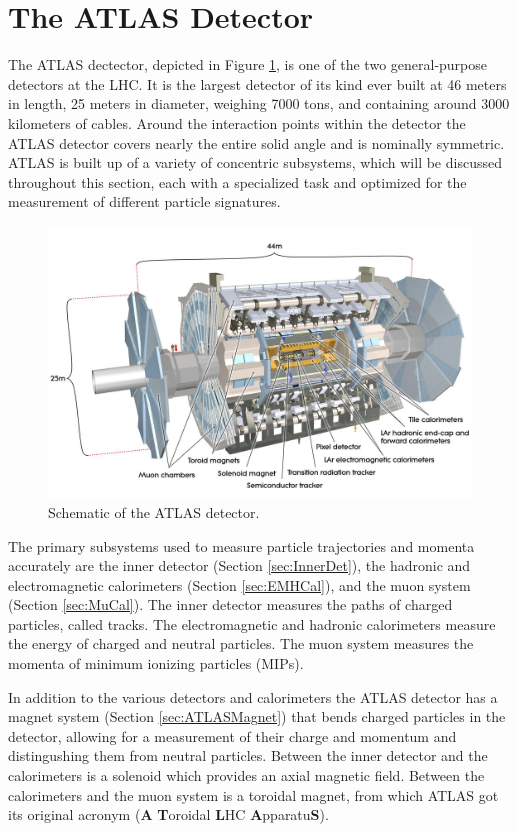 \section{The ATLAS Detector}
\label{sec:ATLAS}
The ATLAS dectector, depicted in Figure \ref{fig:ATLASOverview}, is one of the two general-purpose detectors at the LHC.  It is the largest detector of its kind ever built at 46 meters in length, 25 meters in diameter, weighing 7000 tons, and containing around 3000 kilometers of cables\cite{ATLAS}.  Around the interaction points within the detector the ATLAS detector covers nearly the entire solid angle and is nominally symmetric.  ATLAS is built up of a variety of concentric subsystems, which will be discussed throughout this section, each with a specialized task and optimized for the measurement of different particle signatures.  
\begin{figure}[h!]
	\centering
	\includegraphics[width=\columnwidth]{../ThesisImages/LHCImages/AtlasDetector.png}
	\caption[Schematic of the ATLAS detector.]{Schematic of the ATLAS detector.\cite{ATLAS}
	}
	\label{fig:ATLASOverview}
\end{figure}
The primary subsystems used to measure particle trajectories and momenta accurately are the inner detector (Section \ref{sec:InnerDet}), the hadronic and electromagnetic calorimeters (Section \ref{sec:EMHCal}), and the muon system (Section \ref{sec:MuCal}).  The inner detector measures the paths of charged particles, called tracks.  The electromagnetic and hadronic calorimeters measure the energy of charged and neutral particles. The muon system measures the momenta of minimum ionizing particles (MIPs).  

In addition to the various detectors and calorimeters the ATLAS detector has a magnet system (Section \ref{sec:ATLASMagnet}) that bends charged particles in the detector, allowing for a measurement of their charge and momentum and distingushing them from neutral particles.  Between the inner detector and the calorimeters is a solenoid which provides an axial magnetic field.  Between the calorimeters and the muon system is a toroidal magnet, from which ATLAS got its original acronym (\textbf{A} \textbf{T}oroidal \textbf{L}HC \textbf{A}pparatu\textbf{S}).




